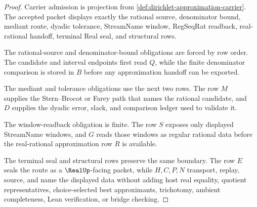 \begin{proof}
Carrier admission is projection from \autoref{def:dirichlet-approximation-carrier}. The accepted packet displays exactly the rational source, denominator bound, mediant route, dyadic tolerance, StreamName window, RegSeqRat readback, real-rational handoff, terminal Real seal, and structural rows.

The rational-source and denominator-bound obligations are forced by row order. The candidate and interval endpoints first read $Q$, while the finite denominator comparison is stored in $B$ before any approximation handoff can be exported.

The mediant and tolerance obligations use the next two rows. The row $M$ supplies the Stern--Brocot or Farey path that names the rational candidate, and $D$ supplies the dyadic error, slack, and comparison ledger used to validate it.

The window-readback obligation is finite. The row $S$ exposes only displayed StreamName windows, and $G$ reads those windows as regular rational data before the real-rational approximation row $R$ is available.

The terminal seal and structural rows preserve the same boundary. The row $E$ seals the route as a $\RealUp$-facing packet, while $H,C,P,N$ transport, replay, source, and name the displayed data without adding host real equality, quotient representatives, choice-selected best approximants, trichotomy, ambient completeness, Lean verification, or bridge checking.
\end{proof}


